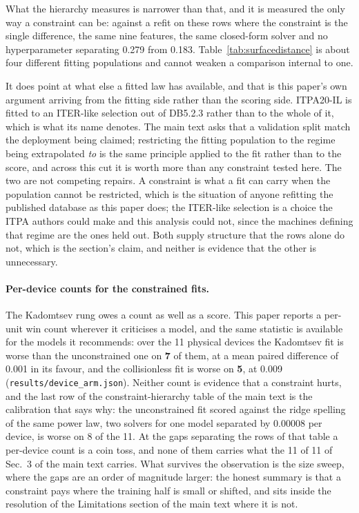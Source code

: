 \documentclass[12pt,letterpaper]{article}
\begin{document}
What the hierarchy measures is narrower than that, and it is measured the only
way a constraint can be: against a refit on these rows where the constraint is
the single difference, the same nine features, the same closed-form solver and
no hyperparameter separating 0.279 from 0.183. Table~\ref{tab:surfacedistance}
is about four different fitting populations and cannot weaken a comparison
internal to one.

It does point at what else a fitted law has available, and that is this paper's
own argument arriving from the fitting side rather than the scoring side.
ITPA20-IL is fitted to an ITER-like selection out of DB5.2.3 rather than to the
whole of it, which is what its name denotes. The main text asks that a
validation split match the deployment being claimed; restricting the fitting
population to the regime being extrapolated \emph{to} is the same principle
applied to the fit rather than to the score, and across this cut it is worth
more than any constraint tested here. The two are not competing repairs. A
constraint is what a fit can carry when the population cannot be restricted,
which is the situation of anyone refitting the published database as this paper
does; the ITER-like selection is a choice the ITPA authors could make and this
analysis could not, since the machines defining that regime are the ones held
out. Both supply structure that the rows alone do not, which is the section's
claim, and neither is evidence that the other is unnecessary.

\paragraph{Per-device counts for the constrained fits.}
The Kadomtsev rung owes a count as well as a score. This paper reports a per-unit win
count wherever it criticises a model, and the same statistic is available for
the models it recommends: over the 11 physical devices the Kadomtsev fit is
worse than the unconstrained one on \textbf{7} of them, at a mean paired
difference of 0.001 in its favour, and the collisionless fit is worse on
\textbf{5}, at 0.009 (\texttt{results/device\_arm.json}). Neither count is
evidence that a constraint hurts, and the last row of
the constraint-hierarchy table of the main text is the calibration that says why: the unconstrained
fit scored against the ridge spelling of the same power law, two solvers for one
model separated by 0.00008 per device, is worse on 8 of the 11. At the gaps
separating the rows of that table a per-device count is a coin toss, and none of
them carries what the 11 of 11 of Sec.~3 of the main text carries. What survives
the observation is the size sweep, where the gaps are an order of magnitude
larger: the honest summary is that a constraint pays where the training half is
small or shifted, and sits inside the resolution of the Limitations section of the main text
where it is not.
\end{document}
